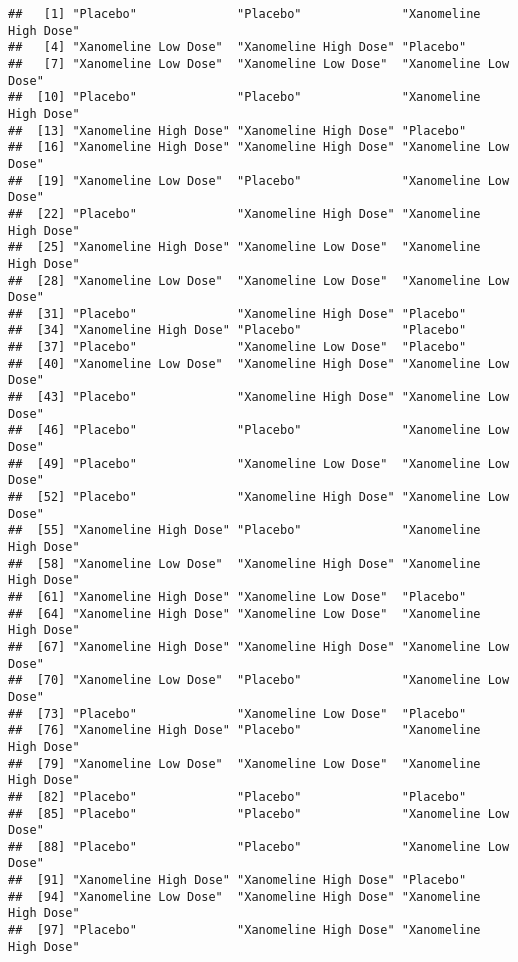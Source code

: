 \documentclass[]{book}
\begin{document}
\begin{verbatim}
##   [1] "Placebo"              "Placebo"              "Xanomeline High Dose"
##   [4] "Xanomeline Low Dose"  "Xanomeline High Dose" "Placebo"             
##   [7] "Xanomeline Low Dose"  "Xanomeline Low Dose"  "Xanomeline Low Dose" 
##  [10] "Placebo"              "Placebo"              "Xanomeline High Dose"
##  [13] "Xanomeline High Dose" "Xanomeline High Dose" "Placebo"             
##  [16] "Xanomeline High Dose" "Xanomeline High Dose" "Xanomeline Low Dose" 
##  [19] "Xanomeline Low Dose"  "Placebo"              "Xanomeline Low Dose" 
##  [22] "Placebo"              "Xanomeline High Dose" "Xanomeline High Dose"
##  [25] "Xanomeline High Dose" "Xanomeline Low Dose"  "Xanomeline High Dose"
##  [28] "Xanomeline Low Dose"  "Xanomeline Low Dose"  "Xanomeline Low Dose" 
##  [31] "Placebo"              "Xanomeline High Dose" "Placebo"             
##  [34] "Xanomeline High Dose" "Placebo"              "Placebo"             
##  [37] "Placebo"              "Xanomeline Low Dose"  "Placebo"             
##  [40] "Xanomeline Low Dose"  "Xanomeline High Dose" "Xanomeline Low Dose" 
##  [43] "Placebo"              "Xanomeline High Dose" "Xanomeline Low Dose" 
##  [46] "Placebo"              "Placebo"              "Xanomeline Low Dose" 
##  [49] "Placebo"              "Xanomeline Low Dose"  "Xanomeline Low Dose" 
##  [52] "Placebo"              "Xanomeline High Dose" "Xanomeline Low Dose" 
##  [55] "Xanomeline High Dose" "Placebo"              "Xanomeline High Dose"
##  [58] "Xanomeline Low Dose"  "Xanomeline High Dose" "Xanomeline High Dose"
##  [61] "Xanomeline High Dose" "Xanomeline Low Dose"  "Placebo"             
##  [64] "Xanomeline High Dose" "Xanomeline Low Dose"  "Xanomeline High Dose"
##  [67] "Xanomeline High Dose" "Xanomeline High Dose" "Xanomeline Low Dose" 
##  [70] "Xanomeline Low Dose"  "Placebo"              "Xanomeline Low Dose" 
##  [73] "Placebo"              "Xanomeline Low Dose"  "Placebo"             
##  [76] "Xanomeline High Dose" "Placebo"              "Xanomeline High Dose"
##  [79] "Xanomeline Low Dose"  "Xanomeline Low Dose"  "Xanomeline High Dose"
##  [82] "Placebo"              "Placebo"              "Placebo"             
##  [85] "Placebo"              "Placebo"              "Xanomeline Low Dose" 
##  [88] "Placebo"              "Placebo"              "Xanomeline Low Dose" 
##  [91] "Xanomeline High Dose" "Xanomeline High Dose" "Placebo"             
##  [94] "Xanomeline Low Dose"  "Xanomeline High Dose" "Xanomeline High Dose"
##  [97] "Placebo"              "Xanomeline High Dose" "Xanomeline High Dose"

\end{verbatim}
\end{document}
